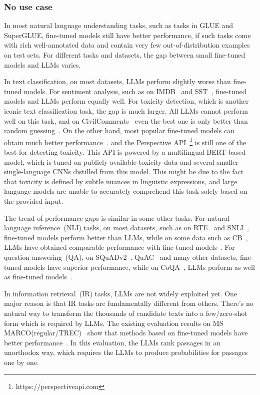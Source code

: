 \documentclass[manuscript,screen, nonacm]{acmart}
\begin{document}
\subsubsection{No use case}
In most natural language understanding tasks, such as tasks in GLUE\cite{wang2018glue} and SuperGLUE\cite{wang2019superglue}, fine-tuned models still have better performance, if such tasks come with rich well-annotated data and contain very few out-of-distribution examples on test sets. For different tasks and datasets, the gap between small fine-tuned models and LLMs varies. 

In text classification, on most datasets, LLMs perform slightly worse than fine-tuned models. %
For sentiment analysis, such as on IMDB~\cite{maas2011learning} and SST~\cite{socher2013recursive}, fine-tuned models and LLMs perform equally well. For toxicity detection, which is another iconic text classification task, the gap is much larger. All LLMs cannot perform well on this task, and on CivilComments~\cite{borkan2019nuanced} even the best one is only better than random guessing~\cite{liang2022holistic}. On the other hand, most popular fine-tuned models can obtain much better performance~\cite{duchene2023benchmark}. 
and the Perspective API~\footnote{https://perspectiveapi.com} is still one of the best for detecting toxicity. This API is powered by a multilingual BERT-based model, which is tuned on publicly available toxicity data 
and several smaller single-language CNNs distilled from this model.
This might be due to the fact that toxicity is defined by subtle nuances in linguistic expressions, and large language models are unable to accurately comprehend this task solely based on the provided input.  

The trend of performance gaps is similar in some other tasks. For natural language inference~(NLI) tasks, on most datasets, such as on RTE~\cite{wang2018glue} and SNLI~\cite{snli:emnlp2015}, fine-tuned models perform better than LLMs, while on some data such as CB~\cite{wang2019superglue}, LLMs have obtained comparable performance with fine-tuned models~\cite{chowdhery2022palm}. For question answering~(QA), on SQuADv2~\cite{rajpurkar2018know}, QuAC~\cite{choi2018quac} and many other datasets, fine-tuned models have superior performance, while on CoQA~\cite{reddy2019coqa}, LLMs perform as well as fine-tuned models~\cite{chowdhery2022palm}.  %



In information retrieval~(IR) tasks, LLMs are not widely exploited yet. One major reason is that IR tasks are fundamentally different from others. There's no natural way to transform the thousands of candidate texts into a few/zero-shot form which is required by LLMs. The existing evaluation results on MS MARCO(regular/TREC)~\cite{nguyen2016ms} show that methods based on fine-tuned models have better performance~\cite{liang2022holistic}. In this evaluation, the LLMs rank passages in an unorthodox way, which requires the LLMs to produce probabilities for passages one by one. 
\end{document}
